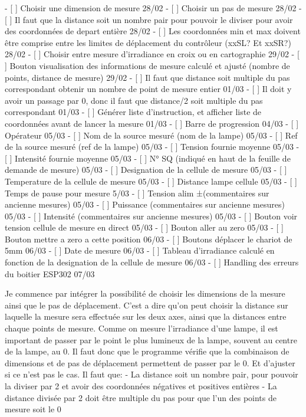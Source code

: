 \documentclass[a4paper, 12pt]{article}
\begin{document}
- [ ] Choisir une dimension de mesure  28/02
- [ ] Choisir un pas de mesure  28/02
- [ ] Il faut que la distance soit un nombre pair pour pouvoir le diviser pour avoir des coordonnées de depart entière  28/02
- [ ] Les coordonnées min et max doivent être comprise entre les limites de déplacement du contrôleur (xxSL? Et xxSR?)  28/02
- [ ] Choisir entre mesure d'irradiance en croix ou en cartographie 29/02
- [ ] Bouton visualisation des informations de mesure calculé et ajusté (nombre de points, distance de mesure)  29/02
- [ ] Il faut que distance soit multiple du pas correspondant obtenir un nombre de point de mesure entier  01/03
- [ ] Il doit y avoir un passage par 0, donc il faut que distance/2 soit multiple du pas correspondant  01/03
- [ ] Générer liste d'instruction, et afficher liste de coordonnées avant de lancer la mesure  01/03
- [ ] Barre de progression  04/03
- [ ] Opérateur  05/03
- [ ] Nom de la source mesuré (nom de la lampe)  05/03
- [ ] Ref de la source mesuré (ref de la lampe)  05/03
- [ ] Tension fournie moyenne  05/03
- [ ] Intensité fournie moyenne  05/03
- [ ] N° SQ (indiqué en haut de la feuille de demande de mesure)  05/03
- [ ] Designation de la cellule de mesure  05/03
- [ ] Temperature de la cellule de mesure  05/03
- [ ] Distance lampe cellule  05/03 
- [ ] Temps de pause pour mesure  5/03
- [ ] Tension alim ±(commentaires sur ancienne mesures)  05/03
- [ ] Puissance (commentaires sur ancienne mesures)  05/03
- [ ] Intensité (commentaires sur ancienne mesures)  05/03
- [ ] Bouton voir tension cellule de mesure en direct  05/03
- [ ] Bouton aller au zero  05/03
- [ ] Bouton mettre a zero a cette position  06/03
- [ ] Boutons déplacer le chariot de 5mm  06/03
- [ ] Date de mesure  06/03
- [ ] Tableau d'irradiance calculé en fonction de la designation de la cellule de mesure  06/03
- [ ] Handling des erreurs du boitier ESP302 07/03 

  
Je commence par intégrer la possibilité de choisir les dimensions de la mesure ainsi que le pas de déplacement.  
C'est a dire qu'on peut choisir la distance sur laquelle la mesure sera effectuée sur les deux axes, ainsi que la distances entre chaque points de mesure.  
Comme on mesure l'irradiance d'une lampe, il est important de passer par le point le plus lumineux de la lampe, souvent au centre de la lampe, au 0.  
Il faut donc que le programme vérifie que la combinaison de dimensions et de pas de déplacement permettent de passer par le 0.  
Et d'ajuster si ce n'est pas le cas.  
Il faut que:  
- La distance soit un nombre pair, pour pouvoir la diviser par 2 et avoir des coordonnées négatives et positives entières  
- La distance divisée par 2 doit être multiple du pas pour que l'un des points de mesure soit le 0  
\end{document}
